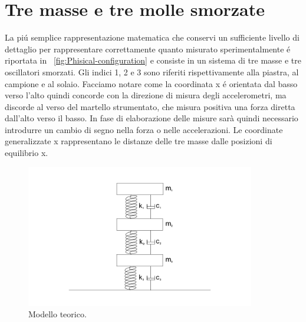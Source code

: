 \documentclass[12pt,a4paper]{article}
\begin{document}
 \section{Tre masse e tre molle smorzate}
 	La pi\'u semplice rappresentazione matematica che conservi un sufficiente livello di dettaglio per rappresentare correttamente quanto misurato sperimentalmente \'e riportata in \figurename~\ref{fig:Phisical-configuration} e consiste in un sistema di tre masse e tre oscillatori smorzati. Gli indici 1, 2 e 3 sono riferiti rispettivamente alla piastra, al campione e al solaio. Facciamo notare come la coordinata x \'e orientata dal basso verso l'alto quindi concorde con la direzione di misura degli accelerometri, ma discorde al verso del martello strumentato, che misura positiva una forza diretta dall'alto verso il basso. In fase di elaborazione delle misure sarà quindi necessario introdurre un cambio di segno nella forza o nelle accelerazioni.
 	Le coordinate generalizzate x rappresentano le distanze delle tre masse dalle posizioni di equilibrio x.
 	\begin{figure}
 		\centering
 		\includegraphics[width=10cm]{model}
 		\caption{Modello teorico.}
 		\label{fig:model}
 	\end{figure}
 	
 	
\end{document}
